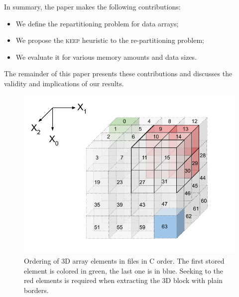\documentclass[sigconf, nonacm]{acmart}
\newcommand{\keep}[0]{\textsc{keep}\xspace}
\begin{document}
In summary, the paper makes the following contributions:
\begin{itemize}
  \item We define the repartitioning problem for data arrays;
  \item We propose the \keep heuristic to the re-partitioning problem;
  \item We evaluate it for various memory amounts and data sizes.
\end{itemize}
The remainder of this paper presents these contributions and discusses the
validity and implications of our results.


\begin{figure}
  \centering
  \includegraphics[scale=0.32]{./figures/figure_1.png}
  \caption{Ordering of 3D array elements in files in C order. The first stored element is colored in green,
  the last one is in blue. Seeking to the red elements is required when extracting the 3D block with plain borders.}
  \label{fig:seeks_and_rowmajor}
\end{figure}
\end{document}
